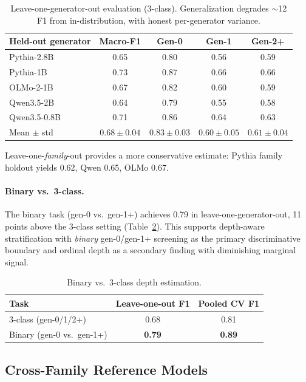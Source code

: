 \documentclass[letterpaper,11pt]{article}
\begin{document}
\begin{table}[t]
\centering
\caption{Leave-one-generator-out evaluation (3-class). Generalization degrades $\sim$12 F1 from in-distribution, with honest per-generator variance.}
\label{tab:logo}
\small
\begin{tabular}{lcccc}
\toprule
Held-out generator & Macro-F1 & Gen-0 & Gen-1 & Gen-2+ \\
\midrule
Pythia-2.8B & 0.65 & 0.80 & 0.56 & 0.59 \\
Pythia-1B & 0.73 & 0.87 & 0.66 & 0.66 \\
OLMo-2-1B & 0.67 & 0.82 & 0.60 & 0.59 \\
Qwen3.5-2B & 0.64 & 0.79 & 0.55 & 0.58 \\
Qwen3.5-0.8B & 0.71 & 0.86 & 0.64 & 0.63 \\
\midrule
Mean $\pm$ std & $0.68 \pm 0.04$ & $0.83 \pm 0.03$ & $0.60 \pm 0.05$ & $0.61 \pm 0.04$ \\
\bottomrule
\end{tabular}
\end{table}

Leave-one-\emph{family}-out provides a more conservative estimate: Pythia family holdout yields 0.62, Qwen 0.65, OLMo 0.67.

\paragraph{Binary vs.\ 3-class.} The binary task (gen-0 vs.\ gen-1+) achieves 0.79 in leave-one-generator-out, 11 points above the 3-class setting (Table~\ref{tab:binary}). This supports depth-aware stratification with \emph{binary} gen-0/gen-1+ screening as the primary discriminative boundary and ordinal depth as a secondary finding with diminishing marginal signal.

\begin{table}[t]
\centering
\caption{Binary vs.\ 3-class depth estimation.}
\label{tab:binary}
\small
\begin{tabular}{lcc}
\toprule
Task & Leave-one-out F1 & Pooled CV F1 \\
\midrule
3-class (gen-0/1/2+) & 0.68 & 0.81 \\
Binary (gen-0 vs.\ gen-1+) & \textbf{0.79} & \textbf{0.89} \\
\bottomrule
\end{tabular}
\end{table}

\subsection{Cross-Family Reference Models}
\label{sec:crossref}
\end{document}
